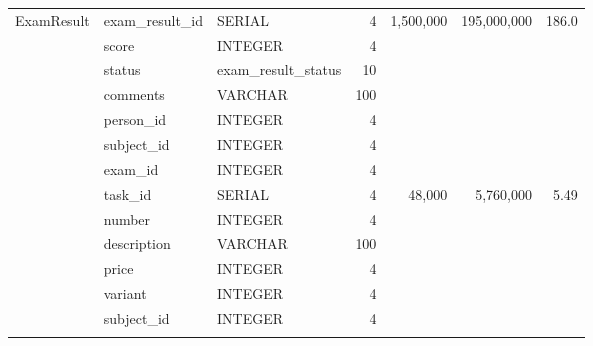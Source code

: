 \documentclass[a4paper]{article}
\begin{document}
{\begin{longtable}{l p{2cm} p{2cm} r r r r}
            \multirow{7}{*}{ExamResult}
                              & exam\_result\_id     & SERIAL               & 4                     & \multirow{7}{*}{1,500,000} & \multirow{7}{*}{195,000,000}  & \multirow{7}{*}{186.0}   \\
                              & score                & INTEGER              & 4                     &                            &                               &                          \\
                              & status               & exam\_result\_status & 10                    &                            &                               &                          \\
                              & comments             & VARCHAR              & 100                   &                            &                               &                          \\
                              & person\_id           & INTEGER              & 4                     &                            &                               &                          \\
                              & subject\_id          & INTEGER              & 4                     &                            &                               &                          \\
                              & exam\_id             & INTEGER              & 4                     &                            &                               &                          \\ \addlinespace
            \hline

            \multirow{6}{*}{Task}
                              & task\_id             & SERIAL               & 4                     & \multirow{6}{*}{48,000}    & \multirow{6}{*}{5,760,000}    & \multirow{6}{*}{5.49}    \\
                              & number               & INTEGER              & 4                     &                            &                               &                          \\
                              & description          & VARCHAR              & 100                   &                            &                               &                          \\
                              & price                & INTEGER              & 4                     &                            &                               &                          \\
                              & variant              & INTEGER              & 4                     &                            &                               &                          \\
                              & subject\_id          & INTEGER              & 4                     &                            &                               &                          \\ \addlinespace


\end{longtable}}
\end{document}
